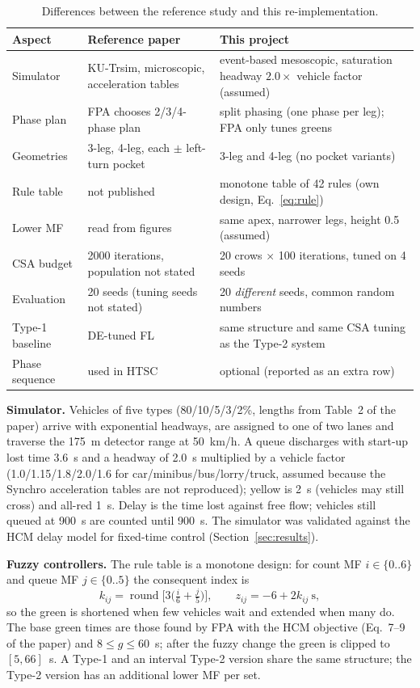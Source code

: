 \begin{table}[t]
\centering\small
\caption{Differences between the reference study and this re-implementation.}\label{tab:diff}
\begin{tabular}{@{}p{3.2cm}p{5.4cm}p{5.6cm}@{}}
\toprule
Aspect & Reference paper & This project \\ \midrule
Simulator & KU-Trsim, microscopic, acceleration tables & event-based mesoscopic, saturation headway $2.0\times$ vehicle factor (assumed) \\
Phase plan & FPA chooses 2/3/4-phase plan & split phasing (one phase per leg); FPA only tunes greens \\
Geometries & 3-leg, 4-leg, each $\pm$ left-turn pocket & 3-leg and 4-leg (no pocket variants) \\
Rule table & not published & monotone table of 42 rules (own design, Eq.~\eqref{eq:rule}) \\
Lower MF & read from figures & same apex, narrower legs, height 0.5 (assumed) \\
CSA budget & 2000 iterations, population not stated & 20 crows $\times$ 100 iterations, tuned on 4 seeds \\
Evaluation & 20 seeds (tuning seeds not stated) & 20 \emph{different} seeds, common random numbers \\
Type-1 baseline & DE-tuned FL \cite{dogan2016} & same structure and same CSA tuning as the Type-2 system \\
Phase sequence & used in HTSC & optional (reported as an extra row) \\ \bottomrule
\end{tabular}
\end{table}

\textbf{Simulator.} Vehicles of five types (80/10/5/3/2\%, lengths from Table~2 of the paper) arrive with exponential headways, are assigned to one of two lanes
and traverse the 175~m detector range at 50~km/h. A queue discharges with start-up lost time 3.6~s and a headway of 2.0~s multiplied by a vehicle factor
(1.0/1.15/1.8/2.0/1.6 for car/minibus/bus/lorry/truck, assumed because the Synchro acceleration tables are not reproduced); yellow is 2~s (vehicles may still cross) and all-red 1~s.
Delay is the time lost against free flow; vehicles still queued at 900~s are counted until 900~s. The simulator was validated against the HCM
delay model for fixed-time control (Section~\ref{sec:results}).

\textbf{Fuzzy controllers.} The rule table is a monotone design: for count MF $i\in\{0..6\}$ and queue MF $j\in\{0..5\}$ the consequent index is
\begin{equation}\label{eq:rule}
k_{ij}=\operatorname{round}\!\Big[3\Big(\tfrac{i}{6}+\tfrac{j}{5}\Big)\Big],\qquad z_{ij}=-6+2k_{ij}\ \text{s},
\end{equation}
so the green is shortened when few vehicles wait and extended when many do. The base green times are those found by FPA with the HCM objective (Eq.~7--9 of the paper) and
$8\le g\le60$~s; after the fuzzy change the green is clipped to $[5,66]$~s. A Type-1 and an interval Type-2 version share the same structure; the Type-2 version has an additional lower MF per set.

